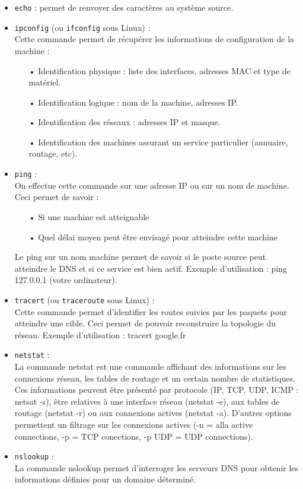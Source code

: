 \documentclass[a4paper]{article}
\begin{document}
	\begin{itemize}
	\item \texttt{echo} : permet de renvoyer des caractères au système source.\\
		
	\item \texttt{ipconfig} (ou \texttt{ifconfig} sous Linux) : \\
	Cette commande permet de récupérer les informations de configuration de la machine : \\
		\begin{itemize}
		\item[•]Identification physique : liste des interfaces, adresses MAC et type de matériel.
		\item[•]Identification logique : nom de la machine, adresses IP.
		\item[•]Identification des réseaux : adresses IP et masque.
		\item[•]Identification des machines assurant un service particulier (annuaire, routage, etc).
		\end{itemize}
		
	\item \texttt{ping} : \\
	On effectue cette commande sur une adresse IP ou sur un nom de machine. Ceci permet de savoir : 
		\begin{itemize}	
		\item[•]Si une machine est atteignable
		\item[•]Quel délai moyen peut être envisagé pour atteindre cette machine
		\end{itemize}
	Le ping sur un nom machine permet de savoir si le poste source peut atteindre le DNS et si ce service est bien actif.
	Exemple d'utilisation : ping 127.0.0.1 (votre ordinateur).
	
	\item \texttt{tracert} (ou \texttt{traceroute} sous Linux) : \\
	Cette commande permet d'identifier les routes suivies par les paquets pour atteindre une cible. Ceci permet de pouvoir reconstruire la topologie du réseau.
	Exemple d'utilisation : tracert google.fr
	
	\item \texttt{netstat} :\\
	La commande netstat est une commande affichant des informations sur les connexions réseau, les tables de routage et un certain nombre de statistiques. 
	Ces informations peuvent être présenté par  protocole (IP, TCP, UDP, ICMP : netsat -s), être relatives à une interface réseau (netstat -e), aux tables de routage (netstat -r) 
	ou aux connexions actives (netstat -a). D'autres options permettent un filtrage sur les connexions actives (-n = alla active connections, -p = TCP conections, -p UDP = UDP connections).
	
	\item \texttt{nslookup} : \\
	La commande nslookup permet d'interroger les serveurs DNS pour obtenir les informations définies pour un domaine déterminé.
	\end{itemize}
\end{document}
